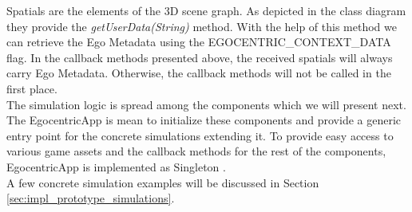 Spatials are the elements of the 3D scene graph. As depicted in the class diagram they provide the \emph{getUserData(String)} method. With the help of this method we can retrieve the Ego Metadata using the EGOCENTRIC\_CONTEXT\_DATA flag. In the callback methods presented above, the received spatials will always carry Ego Metadata. Otherwise, the callback methods will not be called in the first place.\\

The simulation logic is spread among the components which we will present next. The EgocentricApp is mean to initialize these components and provide a generic entry point for the concrete simulations extending it. To provide easy access to various game assets and the callback methods for the rest of the components, EgocentricApp is implemented as Singleton \cite{gamma1994design}.\\

A few concrete simulation examples will be discussed in Section \ref{sec:impl_prototype_simulations}.
